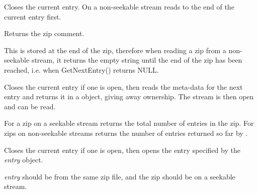 Closes the current entry. On a non-seekable stream reads to the end of
the current entry first.


\label{wxzipinputstreamgetcomment}


Returns the zip comment.

This is stored at the end of the zip, therefore when reading a zip
from a non-seekable stream, it returns the empty string until the
end of the zip has been reached, i.e. when GetNextEntry() returns
NULL.


\label{wxzipinputstreamgetnextentry}


Closes the current entry if one is open, then reads the meta-data for
the next entry and returns it in a 
object, giving away ownership. The stream is then open and can be read.


\label{wxzipinputstreamgettotalentries}


For a zip on a seekable stream returns the total number of entries in
the zip. For zips on non-seekable streams returns the number of entries
returned so far by .


\label{wxzipinputstreamopenentry}


Closes the current entry if one is open, then opens the entry specified
by the {\it entry} object.

{\it entry} should be from the same zip file, and the zip should
be on a seekable stream.




%
%

\section{}\label{wxzipnotifier}

